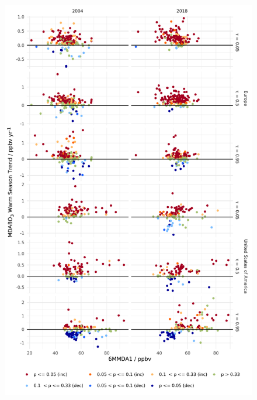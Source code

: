 \documentclass{article}
\begin{document}
\begin{figure}[p]
\centering
\includegraphics[height=0.75\textheight]{figures/si_figures/fS22_mda8_warm_sig_mda8_6mmda1.pdf}
\caption{}
\label{si_fig:mda8_warm_sig_mda8_6mmda1}
\end{figure}
\clearpage
\end{document}
